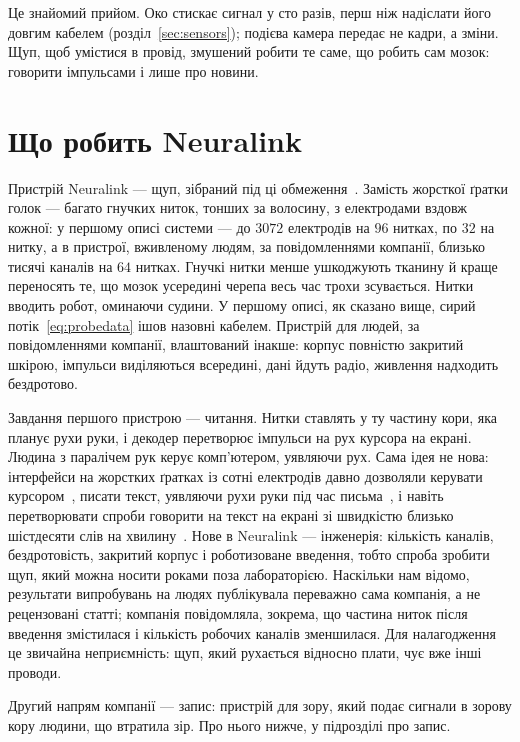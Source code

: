 Це знайомий прийом. Око стискає сигнал у сто разів, перш ніж надіслати його довгим кабелем (розділ~\ref{sec:sensors}); подієва камера передає не кадри, а зміни. Щуп, щоб умістися в провід, змушений робити те саме, що робить сам мозок: говорити імпульсами і лише про новини.

\section{Що робить Neuralink}

Пристрій Neuralink --- щуп, зібраний під ці обмеження~\cite{Musk2019}. Замість жорсткої ґратки голок --- багато гнучких ниток, тонших за волосину, з електродами вздовж кожної: у першому описі системи --- до $3072$ електродів на $96$ нитках, по $32$ на нитку, а в пристрої, вживленому людям, за повідомленнями компанії, близько тисячі каналів на $64$ нитках. Гнучкі нитки менше ушкоджують тканину й краще переносять те, що мозок усередині черепа весь час трохи зсувається. Нитки вводить робот, оминаючи судини. У першому описі, як сказано вище, сирий потік~\eqref{eq:probedata} ішов назовні кабелем. Пристрій для людей, за повідомленнями компанії, влаштований інакше: корпус повністю закритий шкірою, імпульси виділяються всередині, дані йдуть радіо, живлення надходить бездротово.

Завдання першого пристрою --- читання. Нитки ставлять у ту частину кори, яка планує рухи руки, і декодер перетворює імпульси на рух курсора на екрані. Людина з паралічем рук керує комп'ютером, уявляючи рух. Сама ідея не нова: інтерфейси на жорстких ґратках із сотні електродів давно дозволяли керувати курсором~\cite{Hochberg2006}, писати текст, уявляючи рухи руки під час письма~\cite{Willett2021}, і навіть перетворювати спроби говорити на текст на екрані зі швидкістю близько шістдесяти слів на хвилину~\cite{Willett2023}. Нове в Neuralink --- інженерія: кількість каналів, бездротовість, закритий корпус і роботизоване введення, тобто спроба зробити щуп, який можна носити роками поза лабораторією. Наскільки нам відомо, результати випробувань на людях публікувала переважно сама компанія, а не рецензовані статті; компанія повідомляла, зокрема, що частина ниток після введення змістилася і кількість робочих каналів зменшилася. Для налагодження це звичайна неприємність: щуп, який рухається відносно плати, чує вже інші проводи.

Другий напрям компанії --- запис: пристрій для зору, який подає сигнали в зорову кору людини, що втратила зір. Про нього нижче, у підрозділі про запис.

